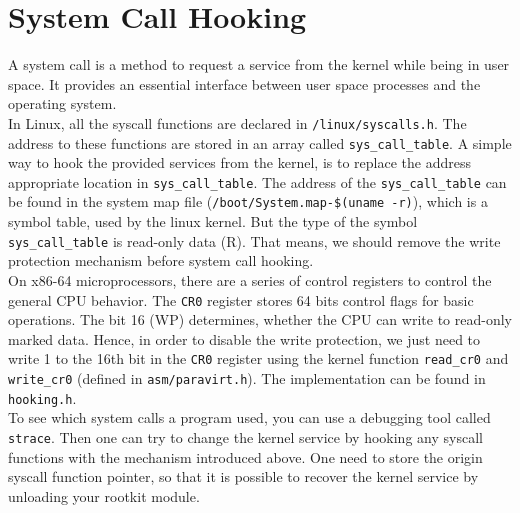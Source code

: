 \section{System Call Hooking}
\label{sec:syscallHooking}
A system call is a method to request a service from the kernel while being in user space. It provides an essential interface between user space processes and the operating system.\\
In Linux, all the syscall functions are declared in \verb+/linux/syscalls.h+. 
The address to these functions are stored in an array called 
\verb+sys_call_table+. 
A simple way to hook the provided services from the kernel, is to replace the 
address appropriate location in \verb+sys_call_table+. The address of the 
\verb+sys_call_table+ can be found in the system map file 
(\verb+/boot/System.map-$(uname -r)+), which is a symbol table, used by the 
linux kernel. But the type of the symbol \verb+sys_call_table+ is read-only data 
(R). That means, we should remove the write protection mechanism before system 
call hooking.\\
On x86-64 microprocessors, there are a series of control registers to control 
the general CPU behavior. The \texttt{CR0} register stores 64 bits control flags 
for basic operations. The bit 16 (WP) determines, whether the CPU can write to 
read-only marked data. Hence, in order to disable the write protection, we just 
need to write 1 to the 16th bit in the \texttt{CR0} register using the kernel 
function \verb+read_cr0+ and \verb+write_cr0+ (defined in 
\verb+asm/paravirt.h+). The implementation can be found in \verb+hooking.h+.\\
To see which system calls a program used, you can use a debugging tool called \texttt{strace}. Then one can try to change the kernel service by hooking any syscall functions with the mechanism introduced above. One need to store the origin syscall function pointer, so that it is possible to recover the kernel service by unloading your rootkit module. 
